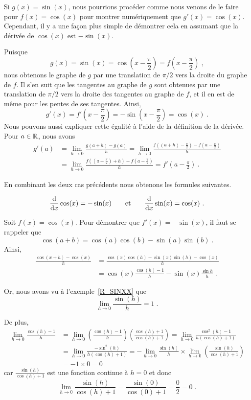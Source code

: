 {Si $g(x) = \sin(x)$, nous pourrions procéder comme nous venons de le faire
pour $f(x)=\cos(x)$ pour montrer numériquement que
$g'(x) = \cos(x)$.  Cependant, il y a une façon plus simple de
démontrer cela en assumant que la dérivée de $\cos(x)$ est
$-\sin(x)$.

Puisque
\[
g(x) = \sin(x) = \cos\left(x-\frac{\pi}{2}\right) =
f\left(x-\frac{\pi}{2}\right) \; ,
\]
nous obtenons le graphe de $g$ par une translation de $\pi/2$
vers la droite du graphe de $f$.  Il s'en suit que les tangentes au
graphe de $g$ sont obtenues par une translation de $\pi/2$
vers la droite des tangentes au graphe de $f$, et il en est de même
pour les pentes de ses tangentes.  Ainsi,
\[
g'(x) = f'\left(x - \frac{\pi}{2}\right) =
-\sin\left(x - \frac{\pi}{2}\right) = \cos(x) \; .
\]
Nous pouvons aussi expliquer cette égalité à l'aide de la définition de la
dérivée.  Pour $a\in \RR$, nous avons
\begin{align*}
g'(a) &= \lim_{h\rightarrow 0} \frac{g(a+h)-g(a)}{h}
= \lim_{h\rightarrow 0} \frac{f\left((a+h)-\frac{\pi}{2}\right) -
f\left(a-\frac{\pi}{2}\right)}{h} \\
&= \lim_{h\rightarrow 0} \frac{f\left(\left(a-\frac{\pi}{2}\right) + h \right)
- f\left(a-\frac{\pi}{2}\right)}{h}
= f'\left(a-\frac{\pi}{2}\right) \ .
\end{align*}

En combinant les deux cas précédents nous obtenons les formules suivantes.

\begin{prop}
\[
\dfdx{\cos(x)}{x} = -\sin(x) \qquad \text{et} \qquad
\dfdx{\sin(x)}{x} = \cos(x) \ .
\]
\end{prop}

Soit $f(x) = \cos(x)$.  Pour démontrer que $f'(x) = -\sin(x)$, il faut
se rappeler que
\[
\cos(a+b) = \cos(a)\cos(b) - \sin(a)\sin(b) \; .
\]
Ainsi,
\begin{align*}
\frac{\cos(x+h)-\cos(x)}{h}
&= \frac{\cos(x)\cos(h) - \sin(x)\sin(h) - \cos(x)}{h} \\
&= \cos(x) \frac{\cos(h)-1}{h} - \sin(x) \frac{\sin{h}}{h} \; .
\end{align*}

Or, nous avons vu à l'exemple~\ref{R_SINXX} que
\[
\lim_{h\rightarrow 0} \frac{\sin(h)}{h} =1 \; .
\]

De plus,
\begin{align*}
\lim_{h\rightarrow 0} \frac{\cos(h)-1}{h}
&= \lim_{h\rightarrow 0} \left(\frac{\cos(h)-1}{h}\right)
\left(\frac{\cos(h)+1}{\cos(h)+1}\right)
= \lim_{h\rightarrow 0}\frac{\cos^2(h)-1}{h(\cos(h)+1)} \\
&= \lim_{h\rightarrow 0} \frac{-\sin^2(h)}{h(\cos(h)+1)}
= -\lim_{h\rightarrow 0} \frac{\sin(h)}{h}
\times \lim_{h\rightarrow 0} \left(\frac{\sin(h)}{\cos(h)+1}\right) \\
&= - 1 \times 0 = 0
\end{align*}
car $\displaystyle \frac{\sin(h)}{\cos(h)+1}$ est une fonction
continue à $h=0$ et donc
\[
\lim_{h\rightarrow 0} \frac{\sin(h)}{\cos(h)+1}=
\frac{\sin(0)}{\cos(0)+1} = \frac{0}{2} = 0 \; .
\]

}
